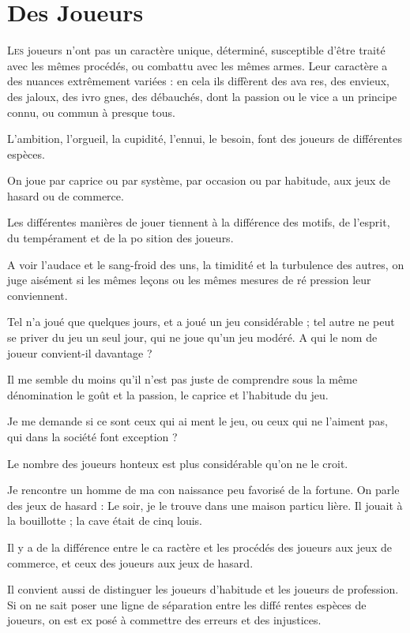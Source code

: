 \chapter[Des joueurs]{Des Joueurs}

\lettrine{L}{es} joueurs n'ont pas un caractère
unique, déterminé, susceptible d'être
traité avec les mêmes procédés, ou
combattu avec les mêmes armes. Leur
caractère a des nuances extrêmement
variées : en cela ils diffèrent des ava%
res, des envieux, des jaloux, des ivro%
gnes, des débauchés, dont la passion
ou le vice a un principe connu, ou
commun à presque tous.

L'ambition, l'orgueil, la cupidité,
l'ennui, le besoin, font des joueurs de
différentes espèces.

On joue par caprice ou par système,
par occasion ou par habitude, aux jeux
de hasard ou de commerce.

Les différentes manières de jouer
tiennent à la différence des motifs, de
l'esprit, du tempérament et de la po%
sition des joueurs.

A voir l'audace et le sang-froid des
uns, la timidité et la turbulence des
autres, on juge aisément si les mêmes
leçons ou les mêmes mesures de ré%
pression leur conviennent.

Tel n'a joué que quelques jours, et
a joué un jeu considérable ; tel autre
ne peut se priver du jeu un seul jour,
qui ne joue qu'un jeu modéré. A qui le
nom de joueur convient-il davantage ?

Il me semble du moins qu'il n'est
pas juste de comprendre sous la même
dénomination le goût et la passion, le
caprice et l'habitude du jeu.

Je me demande si ce sont ceux qui ai%
ment le jeu, ou ceux qui ne l'aiment
pas, qui dans la société font exception ?

Le nombre des joueurs honteux est
plus considérable qu'on ne le croit.

Je rencontre un homme de ma con%
naissance peu favorisé de la fortune.
On parle des jeux de hasard :  Le soir,
je le trouve dans une maison particu%
lière. Il jouait à la bouillotte ; la cave
était de cinq louis.

Il y a de la différence entre le ca%
ractère et les procédés des joueurs aux
jeux de commerce, et ceux des joueurs
aux jeux de hasard.

Il convient aussi de distinguer les 
joueurs d'habitude et les joueurs de
profession. Si on ne sait poser une
ligne de séparation entre les diffé%
rentes espèces de joueurs, on est ex%
posé à commettre des erreurs et des
injustices.

